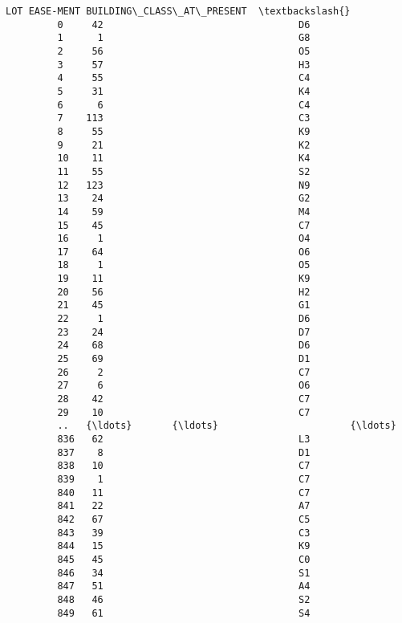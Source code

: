 \documentclass[11pt]{article}
\begin{document}
\begin{Verbatim}[commandchars=\\\{\}]
              LOT EASE-MENT BUILDING\_CLASS\_AT\_PRESENT  \textbackslash{}
         0     42                                  D6   
         1      1                                  G8   
         2     56                                  O5   
         3     57                                  H3   
         4     55                                  C4   
         5     31                                  K4   
         6      6                                  C4   
         7    113                                  C3   
         8     55                                  K9   
         9     21                                  K2   
         10    11                                  K4   
         11    55                                  S2   
         12   123                                  N9   
         13    24                                  G2   
         14    59                                  M4   
         15    45                                  C7   
         16     1                                  O4   
         17    64                                  O6   
         18     1                                  O5   
         19    11                                  K9   
         20    56                                  H2   
         21    45                                  G1   
         22     1                                  D6   
         23    24                                  D7   
         24    68                                  D6   
         25    69                                  D1   
         26     2                                  C7   
         27     6                                  O6   
         28    42                                  C7   
         29    10                                  C7   
         ..   {\ldots}       {\ldots}                       {\ldots}   
         836   62                                  L3   
         837    8                                  D1   
         838   10                                  C7   
         839    1                                  C7   
         840   11                                  C7   
         841   22                                  A7   
         842   67                                  C5   
         843   39                                  C3   
         844   15                                  K9   
         845   45                                  C0   
         846   34                                  S1   
         847   51                                  A4   
         848   46                                  S2   
         849   61                                  S4   

\end{Verbatim}
\end{document}
